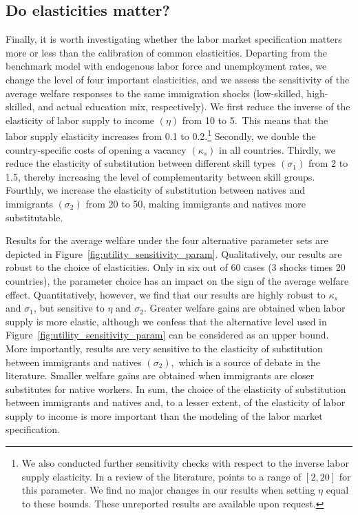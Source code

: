 \documentclass[a4paper,12pt]{article}
\begin{document}
\subsection{Do elasticities matter?} \label{sensitivity_to_parameters}

Finally, it is worth investigating whether the labor market specification matters more or less than the calibration of common elasticities. Departing from the benchmark model with endogenous labor force and unemployment rates, we change the level of four important elasticities, and we assess the sensitivity of the average welfare responses to the same immigration shocks (low-skilled, high-skilled, and actual education mix, respectively). We first reduce the inverse of the elasticity of labor supply to income $\left( \eta \right)$ from 10 to 5.\ This means that the labor supply elasticity increases from 0.1 to 0.2.\footnote{We also conducted further sensitivity checks with respect to the inverse labor supply elasticity. In a review of the literature, \citet{Card1991} points to a range of $[2,20]$ for this parameter. We find no major changes in our results when setting $\eta$ equal to these bounds. These unreported results are available upon request.} Secondly, we double the country-specific costs of opening a vacancy $\left( \kappa _{s}\right) $ in all countries. Thirdly, we reduce the elasticity of substitution between different skill types $\left( \sigma_{1}\right) $ from 2 to 1.5, thereby increasing the level of complementarity between skill groups. Fourthly, we increase the elasticity of substitution between natives and immigrants $\left( \sigma _{2}\right) $ from 20 to 50, making immigrants and natives more substitutable.

Results for the average welfare under the four alternative parameter sets are depicted in Figure~\ref{fig:utility_sensitivity_param}. Qualitatively, our results are robust to the choice of elasticities. Only in six out of 60 cases (3 shocks times 20 countries), the parameter choice has an impact on the sign of the average welfare effect. Quantitatively, however, we find that our results are highly robust to $\kappa _{s}$ and $\sigma _{1}$, but sensitive to $\eta $ and $\sigma _{2}$. Greater welfare gains are obtained when labor supply is more elastic, although we confess that the alternative level used in Figure~\ref{fig:utility_sensitivity_param} can be considered as an upper bound. More importantly, results are very sensitive to the elasticity of substitution between immigrants and natives $\left( \sigma _{2}\right),$ which is a source of debate in the literature. Smaller welfare gains are obtained when immigrants are closer substitutes for native workers. In sum, the choice of the elasticity of substitution between immigrants and natives and, to a lesser extent, of the elasticity of labor supply to income is more important than the modeling of the labor market specification.
\end{document}
